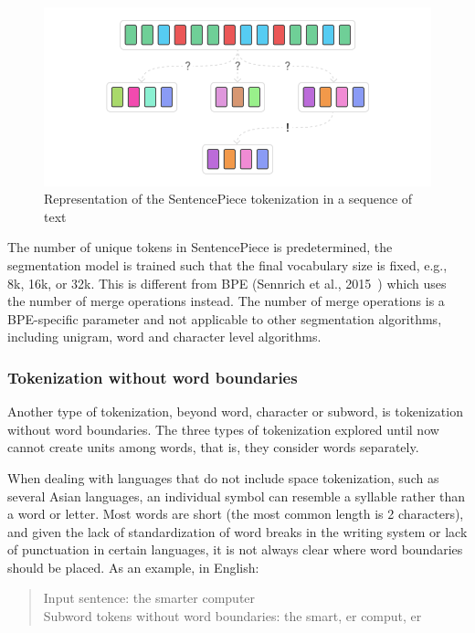\begin{figure}[!ht]
    \centering
    \includegraphics[width=14cm]{figures/sentencepiece.png}
    \caption{Representation of the SentencePiece tokenization in a sequence of text}
\end{figure}

The number of unique tokens in SentencePiece is predetermined, the segmentation model is trained such that the final vocabulary size is fixed, e.g., 8k, 16k, or 32k. This is different from BPE (Sennrich et al., 2015~\cite{sennrich2015neural}) which uses the number of merge operations instead. The number of merge operations is a BPE-specific parameter and not applicable to other segmentation algorithms, including unigram, word and character level algorithms.

\subsubsection{Tokenization without word boundaries}\label{subsec:wordtokwowb}

Another type of tokenization, beyond word, character or subword, is tokenization without word boundaries. The three types of tokenization explored until now cannot create units among words, that is, they consider words separately.

When dealing with languages that do not include space tokenization, such as several Asian languages, an individual symbol can resemble a syllable rather than a word or letter. Most words are short (the most common length is 2 characters), and given the lack of standardization of word breaks in the writing system or lack of punctuation in certain languages, it is not always clear where word boundaries should be placed. As an example, in English:

\begin{quote}
    Input sentence: the smarter computer\\
    Subword tokens without word boundaries: the smart, er comput, er
\end{quote}

